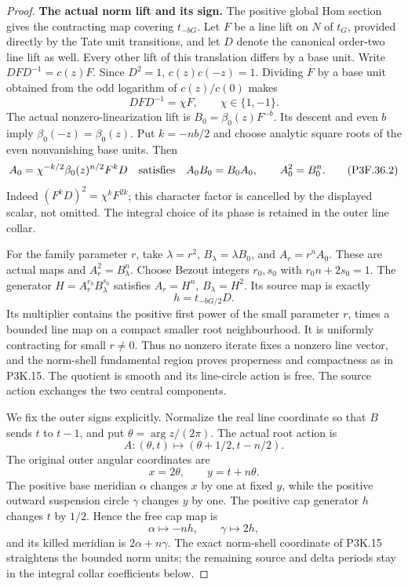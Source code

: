 \begin{proof}
\par\medskip\noindent\textbf{The actual norm lift and its sign.}
The positive global Hom section gives the contracting map covering
\(t_{-bG}\). Let \(F\) be a line lift on \(N\) of
\(t_G\), provided directly by the Tate unit transitions, and
let \(D\) denote the canonical order-two line lift as well.
Every other lift of this translation differs by a base unit.
Write
\(DFD^{-1}=c(z)F\). Since \(D^2=1\),
\(c(z)c(-z)=1\). Dividing \(F\) by a base unit obtained from
the odd logarithm of \(c(z)/c(0)\) makes
\[
                  DFD^{-1}=\chi F,\qquad \chi\in\{1,-1\}.
\]
The actual nonzero-linearization lift is
\(B_0=\beta_0(z)F^{-b}\). Its descent and even \(b\) imply
\(\beta_0(-z)=\beta_0(z)\). Put \(k=-nb/2\) and choose
analytic square roots of the even nonvanishing base units. Then
\[
 A_0=\chi^{-k/2}\beta_0(z)^{n/2}F^kD
 \quad\hbox{satisfies}\quad
 A_0B_0=B_0A_0,\qquad A_0^2=B_0^n.                         \tag{P3F.36.2}
\]
Indeed \((F^kD)^2=\chi^kF^{2k}\); this character factor
is cancelled by the displayed scalar, not omitted. The integral
choice of its phase is retained in the outer line collar.

For the family parameter \(r\), take
\(\lambda=r^2\), \(B_\lambda=\lambda B_0\), and
\(A_r=r^nA_0\). These are actual maps and
\(A_r^2=B_\lambda^n\). Choose Bezout integers \(r_0,s_0\) with \(r_0n+2s_0=1\). The generator
\(H=A_r^{r_0}B_\lambda^{s_0}\) satisfies
\(A_r=H^n\), \(B_\lambda=H^2\). Its source map is exactly
\[
                         h=t_{-bG/2}D.
\]
Its multiplier contains the positive first power of the small
parameter \(r\), times a bounded line map on a compact smaller
root neighbourhood. It is uniformly contracting for small
\(r\ne0\). Thus no nonzero iterate fixes a nonzero line vector,
and the norm-shell fundamental region proves properness and
compactness as in P3K.15. The quotient is smooth and its line-circle
action is free. The source action exchanges the two central
components.

We fix the outer signs explicitly. Normalize the real line
coordinate so that \(B\) sends \(t\) to \(t-1\), and put
\(\theta=\arg z/(2\pi)\). The actual root action is
\[
 A:(\theta,t)\longmapsto(\theta+1/2,t-n/2).
\]
The original outer angular coordinates are
\[
                       x=2\theta,\qquad y=t+n\theta.
                                                               \tag{P3F.36.3}
\]
The positive base meridian \(\alpha\) changes \(x\) by one
at fixed \(y\), while the positive outward suspension circle
\(\gamma\) changes \(y\) by one. The positive cap generator
\(h\) changes \(t\) by \(1/2\). Hence the free cap map is
\[
                         \alpha\longmapsto-nh,
                  \qquad \gamma\longmapsto2h,               \tag{P3F.36.4}
\]
and its killed meridian is \(2\alpha+n\gamma\).
The exact norm-shell coordinate of P3K.15 straightens the bounded
norm units; the remaining source and delta periods stay in the
integral collar coefficients below.


\end{proof}
